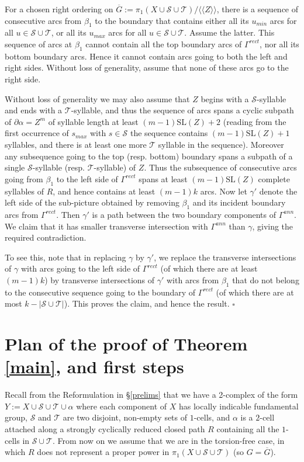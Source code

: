 \documentclass[12pt,a4paper]{amsart}
\def\ol{\overline}
\def\<{\langle}
\def\>{\rangle}
\def\G{\Gamma}
\def\a{\alpha}
\def\b{\beta}
\def\g{\gamma}
\def\cS{\mathcal{S}}
\def\cT{\mathcal{T}}
\begin{document}
For a chosen right ordering on $\ol{G}:=\pi_1(X\cup\cS\cup\cT)/\<\<Z\>\>$, 
there is a sequence of consecutive arcs from $\b_1$ to the boundary that contains either all its $u_{min}$ arcs for all $u\in\cS\cup\cT$, or all its $u_{max}$  arcs for all $u\in\cS\cup\cT$.  Assume the latter.   This sequence of arcs at $\b_1$ cannot contain all the top boundary arcs of $\G^{rect}$, nor all its bottom boundary arcs.  Hence it cannot contain arcs going to both the left and right sides.  Without loss of generality, assume that none of these arcs go to the right side.  

Without loss of generality we may also assume that $Z$ begins with a $\cS$-syllable and ends with a $\cT$-syllable, and 
thus the sequence of arcs spans a cyclic subpath of $\partial\a=Z^m$ of syllable length at least $(m-1)\text{SL}(Z)+2$
(reading from the first occurrence of $s_{max}$ with $s\in\cS$ the sequence contains $(m-1)\text{SL}(Z)+1$ syllables, and there is at least one more  $\cT$ 
syllable in the sequence). 
Moreover any subsequence going to the top (resp. bottom) boundary spans a subpath of a single $\cS$-syllable (resp. $\cT$-syllable) of $Z$.   
Thus the subsequence of consecutive arcs going from $\b_1$ to the left side of $\G^{rect}$ 
spans   at least 
$(m-1)\text{SL}(Z)$ complete  syllables of $R$, and hence contains at least $(m-1)k$ arcs.   
Now let $\g'$ denote the left side of the sub-picture obtained by removing $\b_1$ and its incident boundary arcs from $\G^{rect}$.   Then $\g'$ is a path between the two boundary components of $\G^{ann}$.  We claim that it has smaller transverse intersection with $\G^{ann}$ than $\g$, giving the required contradiction.

To see this, note that in replacing $\g$ by $\g'$, we replace the  transverse intersections of $\g$ with arcs going to the left side of $\G^{rect}$ (of which there are at least $(m-1)k$) by transverse intersections of $\g'$ with arcs from $\b_1$ that do not belong to the consecutive sequence going to the boundary of $\G^{rect}$ (of which there are at most $k-|\cS\cup\cT|$).  This proves the claim, and hence the result.
\hfill $\square$



\section{Plan of the proof of Theorem \ref{main}, and first steps} \label{plan} 

Recall from the Reformulation in \S \ref{prelims} that we have   a 2-complex of the form
$Y := X \cup\cS \cup\cT \cup\a$ where each component of $X$ has locally indicable fundamental group, 
$\cS$ and $\cT$ are two disjoint, non-empty sets of $1$-cells, 
and $\a$ is a $2$-cell attached along a strongly cyclically reduced closed path $R$ containing all the $1$-cells in $\cS\cup\cT$.  From now on we assume that we are in the torsion-free case, in which $R$ does not represent a proper power in $\pi_1(X\cup\cS\cup\cT)$ (so $G=\ol G$).
 
\end{document}
